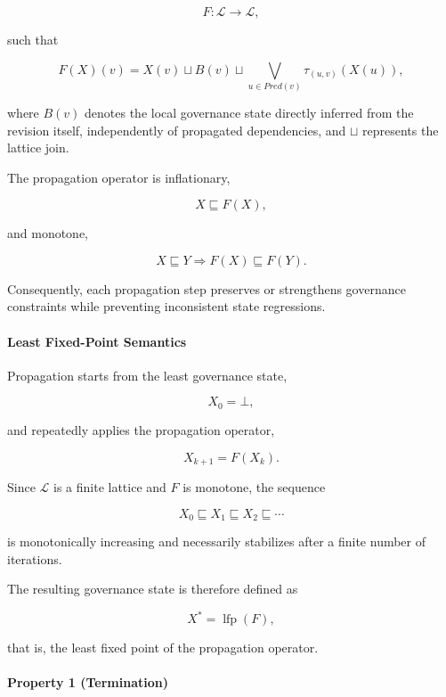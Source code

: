 \documentclass[10pt]{article}
\begin{document}
\[
F:
\mathcal{L}
\rightarrow
\mathcal{L},
\]

such that

\[
F(X)(v)
=
X(v)
\sqcup
B(v)
\sqcup
\bigvee_{u\in Pred(v)}
\tau_{(u,v)}
\!\left(
X(u)
\right),
\]

where $B(v)$ denotes the local governance state directly inferred from the
revision itself, independently of propagated dependencies, and $\sqcup$
represents the lattice join.

The propagation operator is inflationary,

\[
X
\sqsubseteq
F(X),
\]

and monotone,

\[
X
\sqsubseteq
Y
\Longrightarrow
F(X)
\sqsubseteq
F(Y).
\]

Consequently, each propagation step preserves or strengthens governance
constraints while preventing inconsistent state regressions.


\paragraph{Least Fixed-Point Semantics}

Propagation starts from the least governance state,

\[
X_0=\bot,
\]

and repeatedly applies the propagation operator,

\[
X_{k+1}
=
F(X_k).
\]

Since $\mathcal{L}$ is a finite lattice and $F$ is monotone, the sequence

\[
X_0
\sqsubseteq
X_1
\sqsubseteq
X_2
\sqsubseteq
\cdots
\]

is monotonically increasing and necessarily stabilizes after a finite number
of iterations.

The resulting governance state is therefore defined as

\[
X^\ast
=
\operatorname{lfp}(F),
\]

that is, the least fixed point of the propagation operator.


\paragraph{Property 1 (Termination)}
\end{document}
